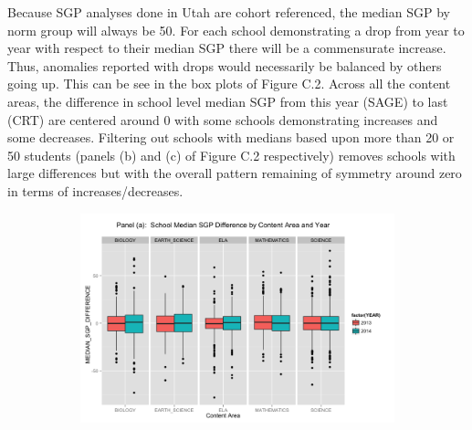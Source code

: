 \documentclass[12pt]{article}
\begin{document}
Because SGP analyses done in Utah are cohort referenced, the median SGP
by norm group will always be 50. For each school demonstrating a drop
from year to year with respect to their median SGP there will be a
commensurate increase. Thus, anomalies reported with drops would
necessarily be balanced by others going up. This can be see in the box
plots of Figure C.2. Across all the content areas, the difference in
school level median SGP from this year (SAGE) to last (CRT) are centered
around 0 with some schools demonstrating increases and some decreases.
Filtering out schools with medians based upon more than 20 or 50
students (panels (b) and (c) of Figure C.2 respectively) removes schools
with large differences but with the overall pattern remaining of
symmetry around zero in terms of increases/decreases.

\begin{figure}[H]
\caption*{\label{fig:Bidensity} {\bf{Fig. C.2:}} Median SGP by Year and Content Area.}
  \begin{subfigure}[b]{\textwidth}
    \includegraphics[width=\textwidth]{../img/Appendices/Appendix_C/Boxplot_MSGP_by_Year-1.png}
  \end{subfigure}
\end{figure}

\pagebreak
\end{document}
